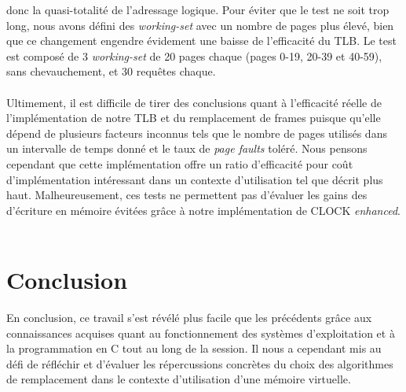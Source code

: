 \documentclass{article}
\begin{document}
donc la quasi-totalité de l’adressage logique. Pour éviter que le test ne soit trop long, nous avons défini des \emph{working-set} avec un nombre 
de pages plus élevé, bien que ce changement engendre évidement une baisse de l’efficacité du TLB. Le test est composé de 3 \emph{working-set} de 
20 pages chaque (pages 0-19, 20-39 et 40-59), sans chevauchement, et 30 requêtes chaque. \\
\\
Ultimement, il est difficile de tirer des conclusions quant à l’efficacité réelle de l’implémentation de notre TLB et du remplacement de frames 
puisque qu’elle dépend de plusieurs facteurs inconnus tels que le nombre de pages utilisés dans un intervalle de temps donné et le taux de 
\emph{page faults} toléré. Nous pensons cependant que cette implémentation offre un ratio d’efficacité pour coût d’implémentation intéressant 
dans un contexte d’utilisation tel que décrit plus haut. Malheureusement, ces tests ne permettent pas d’évaluer les gains des d’écriture en 
mémoire évitées grâce à notre implémentation de CLOCK \emph{enhanced}.\\
\\
\section{Conclusion}
\setlength{\parindent}{20pt}
En conclusion, ce travail s’est révélé plus facile que les précédents grâce aux connaissances acquises quant au fonctionnement des systèmes 
d’exploitation et à la programmation en C tout au long de la session. Il nous a cependant mis au défi de réfléchir et d’évaluer les  
répercussions concrètes du choix des algorithmes de remplacement dans le contexte d’utilisation d’une mémoire virtuelle.\\
\end{document}

